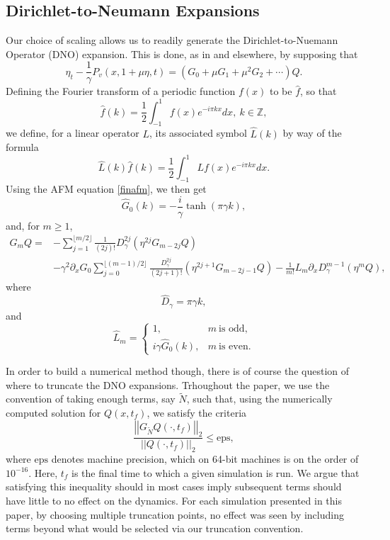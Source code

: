 \documentclass[a4paper,11pt]{article}
\newcommand{\ba}{\begin{array}}
\newcommand{\ea}{\end{array}}
\newcommand{\p}{\partial}
\newcommand{\gnorm}[1]{\left|\left| #1\right|\right|}
\begin{document}
\subsection{Dirichlet-to-Neumann Expansions}
Our choice of scaling allows us to readily generate the Dirichlet-to-Nuemann Operator (DNO) expansion.  This is done, as in \cite{craig} and elsewhere, by supposing that 
\[
\eta_{t} - \frac{1}{\gamma}P_{v}(x,1+\mu \eta,t) = \left(G_{0} + \mu G_{1} + \mu^{2}  G_{2} + \cdots \right)Q.
\]
Defining the Fourier transform of a periodic function $f(x)$ to be $\hat{f}$, so that 
\[
\hat{f}(k) = \frac{1}{2}\int_{-1}^{1}f(x)e^{-i\pi k x} dx, ~ k\in \mathbb{Z},
\]
we define, for a linear operator $L$, its associated symbol $\hat{L}(k)$ by way of the formula 
\[
\hat{L}(k)\hat{f}(k) = \frac{1}{2}\int_{-1}^{1} Lf(x) e^{-i\pi k x}dx.
\]
Using the AFM equation \eqref{finafm}, we then get 
\[
\hat{G}_{0}(k) = -\frac{i}{\gamma}\tanh(\pi \gamma k),
\]
and, for $m\geq 1$, 
\begin{align*}
G_{m}Q = & -\sum_{j=1}^{\lfloor{m/2}\rfloor}\frac{1}{(2j)!}D^{2j}_{\gamma}\left(\eta^{2j}G_{m-2j}Q\right) \\
& - \gamma^{2}\p_{x}G_{0} \sum_{j=0}^{\lfloor{(m-1)/2}\rfloor}\frac{D_{\gamma}^{2j}}{(2j+1)!}\left(\eta^{2j+1}G_{m-2j-1}Q\right) - \frac{1}{m!}L_{m} \p_{x}D_{\gamma}^{m-1}\left(\eta^{m}Q \right),
\end{align*}
where
\[
\hat{D}_{\gamma} = \pi \gamma k,
\]
and
\[
\hat{L}_{m} = \left\{
\ba{rl}
1,  & m~\mbox{is odd}, \\
i\gamma \hat{G}_{0}(k),  & m~\mbox{is even}.
\ea
\right.
\]

In order to build a numerical method though, there is of course the question of where to truncate the DNO expansions.  Trhoughout the paper, we use the convention of taking enough terms, say $\tilde{N}$, such that, using the numerically computed solution for $Q(x,t_{f})$, we satisfy the criteria  
\begin{equation}
\frac{\gnorm{G_{\tilde{N}} Q(\cdot,t_{f})}_{2}}{\gnorm{Q(\cdot,t_{f})}_{2}} \leq \mbox{eps},
\label{trunccond}
\end{equation}
where $\mbox{eps}$ denotes machine precision, which on 64-bit machines is on the order of $10^{-16}$.  Here, $t_{f}$ is the final time to which a given simulation is run.  We argue that satisfying this inequality should in most cases imply subsequent terms should have little to no effect on the dynamics.  For each simulation presented in this paper, by choosing multiple truncation points, no effect was seen by including terms beyond what would be selected via our truncation convention.
\end{document}
